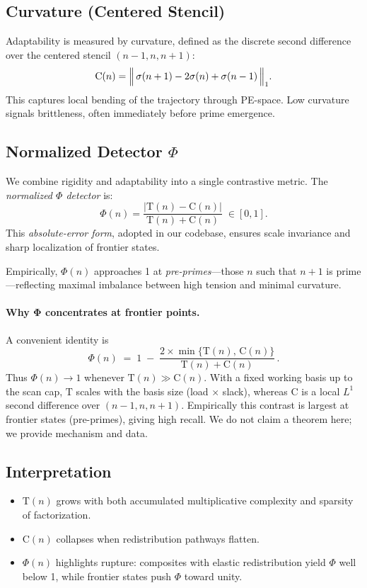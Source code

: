 \documentclass[11pt]{article}
\theoremstyle{plain}
\theoremstyle{definition}
\newcommand{\tension}{\mathrm{T}}                           %
\newcommand{\curv}{\mathrm{C}}                              %
\newcommand{\phidet}{\Phi}                                  %
\begin{document}
\subsection{Curvature (Centered Stencil)}
Adaptability is measured by curvature, defined as the discrete second difference over the centered stencil $(n-1,n,n+1)$:
\[
\curv(n) = \Bigl\|\, \sigma(n+1) - 2\sigma(n) + \sigma(n-1) \,\Bigr\|_1.
\]
This captures local bending of the trajectory through PE-space. Low curvature signals brittleness, often immediately before prime emergence.

\subsection{Normalized Detector $\Phi$}
We combine rigidity and adaptability into a single contrastive metric. The \emph{normalized $\Phi$ detector} is:
\[
\phidet(n) = \frac{|\tension(n) - \curv(n)|}{\tension(n) + \curv(n)} \;\in [0,1].
\]
This \emph{absolute-error form}, adopted in our codebase, ensures scale invariance and sharp localization of frontier states.  

Empirically, $\phidet(n)$ approaches 1 at \emph{pre-primes}—those $n$ such that $n+1$ is prime—reflecting maximal imbalance between high tension and minimal curvature.

\paragraph{Why $\boldsymbol{\Phi}$ concentrates at frontier points.}
A convenient identity is
\[
\phidet(n) \;=\; 1 \;-\; \frac{2 \times \min\{\tension(n),\,\curv(n)\}}{\tension(n)+\curv(n)}\,.
\]
Thus $\phidet(n)\to 1$ whenever $\tension(n)\gg \curv(n)$. With a fixed working basis up to the scan cap, $\tension$ scales with the basis size (load $\times$ slack), whereas $\curv$ is a local $L^1$ second difference over $(n\!-\!1,n,n\!+\!1)$. Empirically this contrast is largest at frontier states (pre-primes), giving high recall. We do not claim a theorem here; we provide mechanism and data.

\subsection{Interpretation}
\begin{itemize}
  \item $\tension(n)$ grows with both accumulated multiplicative complexity and sparsity of factorization.
  \item $\curv(n)$ collapses when redistribution pathways flatten.
  \item $\phidet(n)$ highlights rupture: composites with elastic redistribution yield $\Phi$ well below 1, while frontier states push $\Phi$ toward unity.
\end{itemize}
\end{document}
